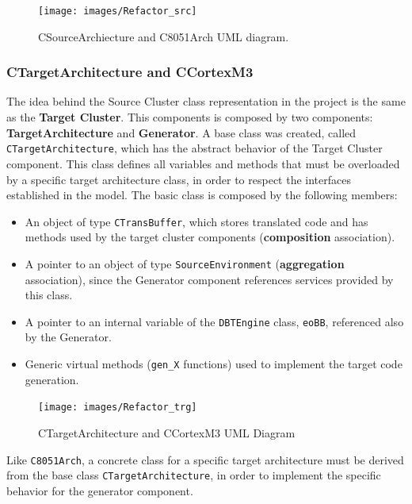 \documentclass[12pt]{article}
\begin{document}
{\begin{figure}[!htb]
\centerline{
\texttt{[image: images/Refactor\_src]}
}
\caption{CSourceArchiecture and C8051Arch UML diagram.}
\label{fig:sourcearchitectureUML} 
\end{figure}



\subsubsection*{CTargetArchitecture and CCortexM3}

The idea behind the Source Cluster class representation in the project is the same as the \textbf{Target Cluster}. This components is composed by two components: \textbf{TargetArchitecture} and \textbf{Generator}. A base class was created, called \texttt{CTargetArchitecture}, which has the abstract behavior of the Target Cluster component. This class defines all variables and methods that must be overloaded by a specific target architecture class, in order to respect the interfaces established in the model.  The basic class is composed by the following members:

\begin{itemize}
\item An object of type \texttt{CTransBuffer}, which stores translated code and has methods used by the target cluster components (\textbf{composition} association).
\item A pointer to an object of type \texttt{SourceEnvironment} (\textbf{aggregation} association), since the Generator component references services provided by this class.
\item A pointer to an internal variable of the \texttt{DBTEngine} class, \texttt{eoBB}, referenced also by the Generator.
\item Generic virtual methods (\texttt{gen\_X} functions) used to implement the target code generation. 
\end{itemize}

\begin{figure}[H]
\centerline{
\texttt{[image: images/Refactor\_trg]}
}
\caption{CTargetArchitecture and CCortexM3 UML Diagram}
\label{fig:refactortrg} 
\end{figure}


Like \texttt{C8051Arch}, a concrete class for a specific target architecture must be derived from the base class \texttt{CTargetArchitecture}, in order to implement the specific behavior for the generator component. 


}
\end{document}
